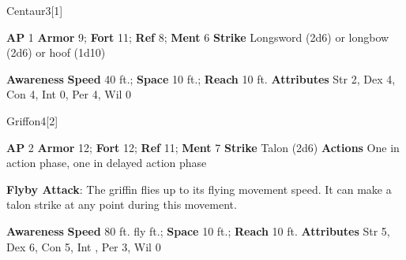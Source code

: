 \begin{monsection}{Centaur}{3}[1]
\vspace{-1em}\vspace{-1em}
\begin{spellcontent}
\begin{spelltargetinginfo}
{\textbf{AP} 1}
\pari \textbf{Armor} 9;
\textbf{Fort} 11;
\textbf{Ref} 8;
\textbf{Ment} 6
\pari \textbf{Strike} Longsword  (2d6) or longbow  (2d6) or hoof  (1d10)
\end{spelltargetinginfo}
\end{spellcontent}
\begin{spellsubcontent}
\begin{spellfooter}
\pari \textbf{Awareness} 
\pari \textbf{Speed} 40 ft.;
\textbf{Space} 10 ft.;
\textbf{Reach} 10 ft.
\pari \textbf{Attributes}
Str 2,
Dex 4,
Con 4,
Int 0,
Per 4,
Wil 0
\end{spellfooter}
\end{spellsubcontent}
\end{monsection}
\begin{monsection}{Griffon}{4}[2]
\vspace{-1em}\vspace{-1em}
\begin{spellcontent}
\begin{spelltargetinginfo}
{\textbf{AP} 2}
\pari \textbf{Armor} 12;
\textbf{Fort} 12;
\textbf{Ref} 11;
\textbf{Ment} 7
\pari \textbf{Strike} Talon  (2d6)
\pari \textbf{Actions} One in action phase, one in delayed action phase
\end{spelltargetinginfo}
\begin{spelleffects}
\pari
\textbf{Flyby Attack}:
The griffin flies up to its flying movement speed.
It can make a talon strike at any point during this movement.
\end{spelleffects}
\end{spellcontent}
\begin{spellsubcontent}
\begin{spellfooter}
\pari \textbf{Awareness} 
\pari \textbf{Speed} 80 ft. fly ft.;
\textbf{Space} 10 ft.;
\textbf{Reach} 10 ft.
\pari \textbf{Attributes}
Str 5,
Dex 6,
Con 5,
Int ,
Per 3,
Wil 0
\end{spellfooter}
\end{spellsubcontent}
\end{monsection}
